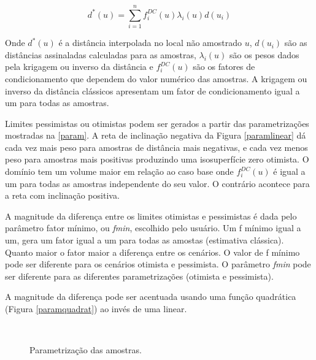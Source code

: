 \begin{equation}
\label{estimador_k}
d^*(u)=\sum_{i=1}^{n} f^{DC}_i(u) \lambda_i(u) d(u_i)
\end{equation}

Onde $d^*(u)$ é a distância interpolada no local não amostrado $u$, $d(u_i)$ são as distâncias assinaladas calculadas para as amostras, $\lambda_i(u)$ são os pesos dados pela krigagem ou inverso da distância e $f^{DC}_i(u)$ são os fatores de condicionamento que dependem do valor numérico das amostras. A krigagem ou inverso da distância clássicos apresentam um fator de condicionamento igual a um para todas as amostras.

Limites pessimistas ou otimistas podem ser gerados a partir das parametrizações mostradas na \autoref{param}. A reta de inclinação negativa da Figura \autoref{paramlinear} dá cada vez mais peso para amostras de distância mais negativas, e cada vez menos peso para amostras mais positivas produzindo uma isosuperfície zero otimista. O domínio tem um volume maior em relação ao caso base onde $f^{DC}_i(u)$ é igual a um para todas as amostras independente do seu valor. O contrário acontece para a reta com inclinação positiva. 

A magnitude da diferença entre os limites otimistas e pessimistas é dada pelo parâmetro fator mínimo, ou \textit{fmin}, escolhido pelo usuário. Um f mínimo igual a um, gera um fator igual a um para todas as amostas (estimativa clássica). Quanto maior o fator maior a diferença entre os cenários. O valor de f mínimo pode ser diferente para os cenários otimista e pessimista. O parâmetro \textit{fmin} pode ser diferente para as diferentes parametrizações (otimista e pessimista).

A magnitude da diferença pode ser acentuada usando uma função quadrática (Figura \autoref{paramquadrat}) ao invés de uma linear.

\begin{figure}[H] 
    \centering
    \caption{Parametrização das amostras.} \label{param}
      \\
\end{figure}

